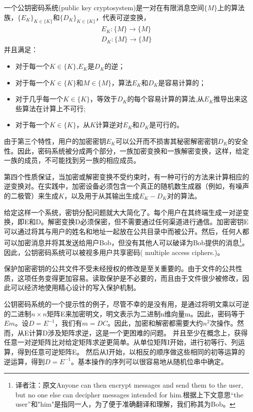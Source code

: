 \documentclass[]{article}
\begin{document}
	一个公钥密码系统(public key cryptosystem)是一对在有限消息空间$\{M\}$上的算法族，$\{E_K\}_{K\in \{K\}}$和$\{D_K\}_{K\in \{K\}}$，代表可逆变换，
	\begin{align}
		E_K : \{M\}\rightarrow \{M\}\\
		D_K :\{M\}\rightarrow \{M\}
	\end{align}
	并且满足：
	\begin{itemize}
		\item 对于每一个$K\in \{K\}$,$E_K$是$D_K$的逆；
		\item 对于每一个$K\in \{K\}$和$M\in \{M\}$，算法$E_K$和$D_K$是容易计算的；
		\item 对于几乎每一个$K\in \{K\}$，等效于$D_K$的每个容易计算的算法,从$E_K$推导出来这些算法在计算上不可行;
		\item 对于每一个$K\in \{K\}$，从$K$计算逆对$E_K$和$D_K$是可行的。
	\end{itemize}


	由于第三个特性，用户的加密密钥$E_K$可以公开而不损害其秘密解密密钥$D_K$的安全性。因此，密码系统被分成两个部分，一族加密变换和一族解密变换，这样，给定一族的成员，不可能找到另一族的相应成员。
	
	第四个性质保证，当加密或解密变换不受约束时，有一种可行的方法来计算相应的逆变换对。在实践中，加密设备必须包含一个真正的随机数生成器（例如，有噪声的二极管）来生成$K$，以及用于从其输出生成$E_K-D_K$对的算法。
	
	给定这样一个系统，密钥分配问题就大大简化了。每个用户在其终端生成一对逆变换，即E和D。解密变换D必须保密，但不需要通过任何渠道进行通信。加密密钥E可以通过将其与用户的姓名和地址一起放在公共目录中而被公开。然后，任何人都可以加密消息并将其发送给用户Bob，但没有其他人可以破译为Bob提供的消息\footnote{译者注：原文Anyone can then encrypt messages and send them to the user, but no one else can decipher messages intended for him.根据上下文意思“the user”和"him"是指同一人，为了便于准确翻译和理解，我们称其为Bob。}。因此，公钥密码系统可以被视多用户共享密码( multiple access ciphers.)。
	
	
	保护加密密钥的公共文件不受未经授权的修改是至关重要的。由于文件的公共性质，这项任务变得更加容易。读取保护是不必要的，而且由于文件很少被修改，因此可以经济地使用精心设计的写入保护机制。
	
	公钥密码系统的一个提示性的例子，尽管不幸的是没有用，是通过将明文乘以可逆的二进制$n\times n$矩阵E来加密明文，明文表示为二进制n维向量m。因此，密码等于$Em$。设$D=E^{-1}$，我们有$m=DC$。因此，加密和解密都需要大约$n^2$次操作。然而，从E计算D涉及矩阵求逆，这是一个更困难的问题。
	并且至少在概念上，获得任意一对逆矩阵比对给定矩阵求逆更简单。从单位矩阵I开始，进行初等行、列运算，得到任意可逆矩阵E。
	然后从I开始，以相反的顺序做这些相同的初等运算的逆运算，得到$D=E^{-1}$。基本操作的序列可以很容易地从随机位串中确定。
	
\end{document}
